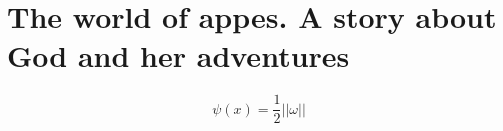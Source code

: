 \documentclass{article}
\begin{document}
\section*{The world of appes. A story about God and her adventures}

\begin{equation}
\psi (x) = \frac{1}{2}||\omega||
\end{equation}
\end{document}

